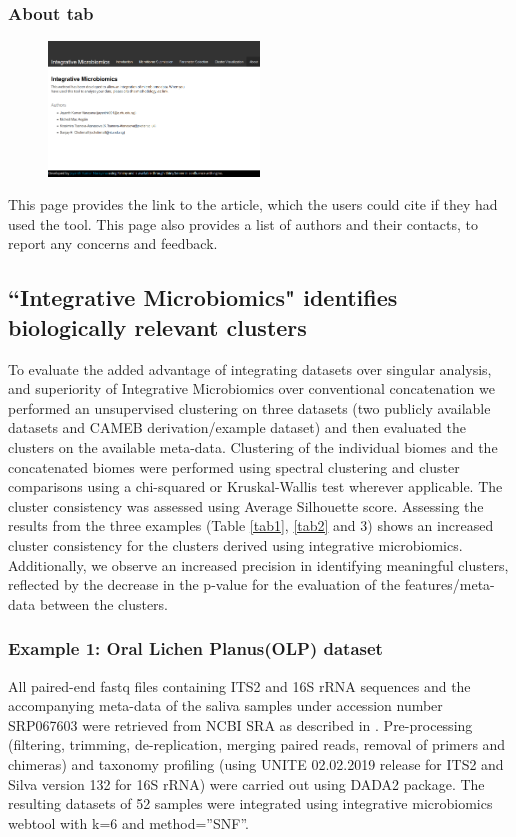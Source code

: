 \subsubsection{About tab}
\begin{figure}[H]
	\centering
\includegraphics[width=0.5\textwidth]{image/about-tab.png}
\end{figure}
This page provides the link to the article, which the users could cite if they had used the tool. This page also provides a list of authors and their contacts, to report any concerns and feedback.

\subsection{``Integrative Microbiomics" identifies biologically relevant clusters}

To evaluate the added advantage of integrating datasets over singular analysis, and superiority of Integrative Microbiomics over conventional concatenation we performed an unsupervised clustering on three datasets (two publicly available datasets and CAMEB derivation/example dataset) and then evaluated the clusters on the available meta-data. Clustering of the individual biomes and the concatenated biomes were performed using spectral clustering and cluster comparisons using a chi-squared or Kruskal-Wallis test wherever applicable. The cluster consistency was assessed using Average Silhouette score. Assessing the results from the three examples (Table \ref{tab1}, \ref{tab2} and 3) shows an increased cluster consistency for the clusters derived using integrative microbiomics. Additionally, we observe an increased precision in identifying meaningful clusters, reflected by the decrease in the p-value for the evaluation of the features/meta-data between the clusters.\\

\subsubsection{Example 1: Oral Lichen Planus(OLP) dataset}
All paired-end fastq files containing ITS2 and 16S rRNA sequences and the accompanying meta-data of the saliva samples under accession number SRP067603 were retrieved from NCBI SRA as described in \cite{Li2019}. Pre-processing (filtering, trimming, de-replication, merging paired reads, removal of primers and chimeras) and taxonomy profiling (using UNITE 02.02.2019 release for ITS2 and Silva version 132 for 16S rRNA) were carried out using DADA2 package. The resulting datasets of 52 samples were integrated using integrative microbiomics webtool with k=6 and method=”SNF”.\\

